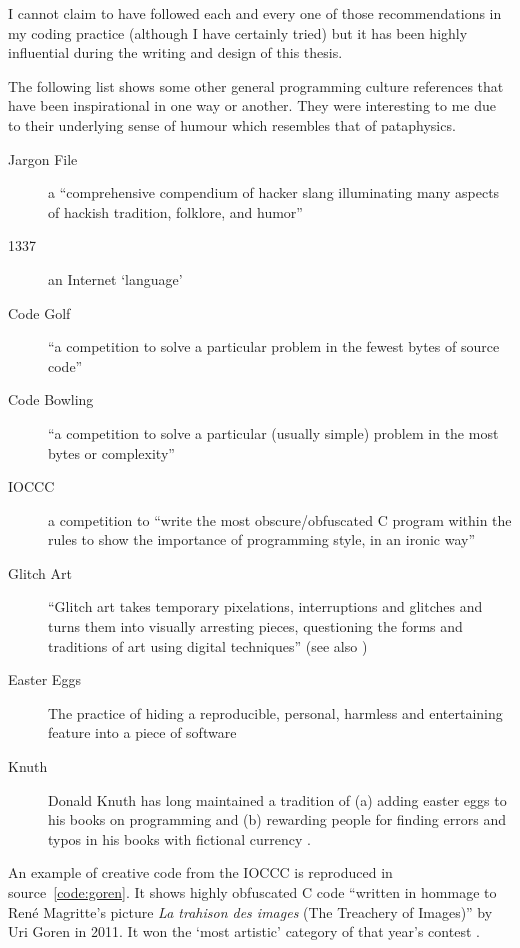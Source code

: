 I cannot claim to have followed each and every one of those recommendations in my coding practice (although I have certainly tried) but it has been highly influential during the writing and design of this thesis.

\spirals

The following list shows some other general programming culture references that have been inspirational in one way or another. They were interesting to me due to their underlying sense of humour which resembles that of pataphysics.

\begin{description}
  \item [Jargon File] a ``comprehensive compendium of hacker slang illuminating many aspects of hackish tradition, folklore, and humor'' \autocite{Raymond2004}
  \item [1337] an Internet `language' \autocite{Thrid2002}
  \item [Code Golf] ``a competition to solve a particular problem in the fewest bytes of source code'' \autocite{StackExchangend}
  \item [Code Bowling] ``a competition to solve a particular (usually simple) problem in the most bytes or complexity'' \autocite{StackBowlnd}
  \item [IOCCC] a competition to ``write the most obscure/obfuscated C program within the rules to show the importance of programming style, in an ironic way'' \autocite{Broukhis}
  \item [Glitch Art] ``Glitch art takes temporary pixelations, interruptions and glitches and turns them into visually arresting pieces, questioning the forms and traditions of art using digital techniques'' \autocite{Wong2013} (see also \autocite{GoogleGlitch,RedditGlitch})
  \item [Easter Eggs] The practice of hiding a reproducible, personal, harmless and entertaining feature into a piece of software \autocite{Wolfnd}
  \item [Knuth] Donald Knuth has long maintained a tradition of (a) adding easter eggs to his books on programming and (b) rewarding people for finding errors and typos in his books with fictional currency \autocite{KnuthHelp}.
\end{description}

\vspace*{-1cm}
An example of creative code from the \ac{IOCCC} is reproduced in source~\ref{code:goren}. It shows highly obfuscated C code ``written in hommage to Ren{\'e} Magritte's picture \textit{La trahison des images} (The Treachery of Images)'' by Uri Goren in 2011. It won the `most artistic' category of that year's contest \autocite{Goren2011}.

